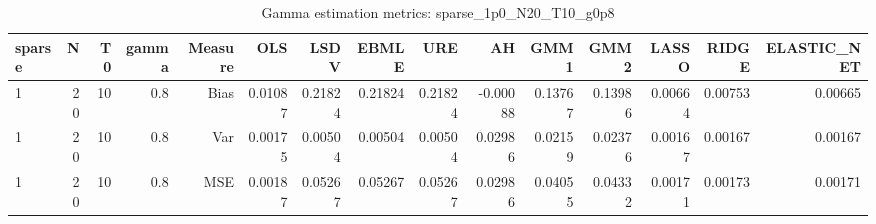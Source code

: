 \begin{table}[!htbp]\centering
\caption{Gamma estimation metrics: sparse_1p0_N20_T10_g0p8}
\label{tab:table1_sparse_1p0_N20_T10_g0p8}
\begin{tabular}{lrrrrrrrrrrrrrr}
\hline
sparse & N & T0 & gamma & Measure & OLS & LSDV & EBMLE & URE & AH & GMM1 & GMM2 & LASSO & RIDGE & ELASTIC_NET \\
\hline
1 & 20 & 10 & 0.8 & Bias & 0.01087 & 0.21824 & 0.21824 & 0.21824 & -0.00088 & 0.13767 & 0.13986 & 0.00664 & 0.00753 & 0.00665 \\
1 & 20 & 10 & 0.8 & Var & 0.00175 & 0.00504 & 0.00504 & 0.00504 & 0.02986 & 0.02159 & 0.02376 & 0.00167 & 0.00167 & 0.00167 \\
1 & 20 & 10 & 0.8 & MSE & 0.00187 & 0.05267 & 0.05267 & 0.05267 & 0.02986 & 0.04055 & 0.04332 & 0.00171 & 0.00173 & 0.00171 \\
\hline
\end{tabular}
\end{table}

